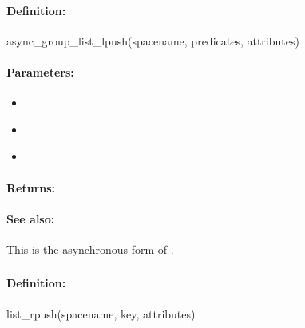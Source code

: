 \paragraph{Definition:}
\begin{rubycode}
async_group_list_lpush(spacename, predicates, attributes)
\end{rubycode}

\paragraph{Parameters:}
\begin{itemize}[noitemsep]
\item {}\\

\item {}\\

\item {}\\

\end{itemize}

\paragraph{Returns:}


\paragraph{See also:}  This is the asynchronous form of .

\pagebreak
\subsubsection{}
\label{api:ruby:list_rpush}


\paragraph{Definition:}
\begin{rubycode}
list_rpush(spacename, key, attributes)
\end{rubycode}

